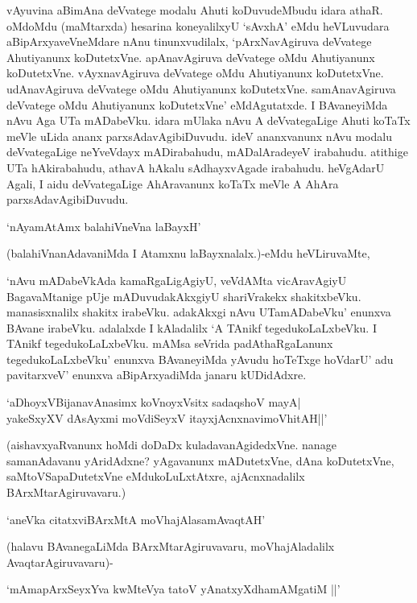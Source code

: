 vAyuvina aBimAna deVvatege modalu Ahuti koDuvudeMbudu idara athaR. oMdoMdu (maMtarxda) hesarina koneyalilxyU `sAvxhA' eMdu heVLuvudara aBipArxyaveVneMdare nAnu tinunxvudilalx, `pArxNavAgiruva deVvatege Ahutiyanunx koDutetxVne. apAnavAgiruva deVvatege oMdu Ahutiyanunx koDutetxVne. vAyxnavAgiruva deVvatege oMdu Ahutiyanunx koDutetxVne. udAnavAgiruva deVvatege oMdu Ahutiyanunx koDutetxVne. samAnavAgiruva deVvatege oMdu Ahutiyanunx koDutetxVne' eMdAgutatxde. I BAvaneyiMda nAvu Aga UTa mADabeVku. idara mUlaka nAvu A deVvategaLige Ahuti koTaTx meVle uLida ananx parxsAdavAgibiDuvudu. ideV ananxvanunx nAvu modalu deVvategaLige neYveVdayx mADirabahudu, mADalAradeyeV irabahudu. atithige UTa hAkirabahudu, athavA hAkalu sAdhayxvAgade irabahudu. heVgAdarU Agali, I aidu deVvategaLige AhAravanunx koTaTx meVle A AhAra parxsAdavAgibiDuvudu.

\begin{shloka}
`nAyamAtAmx balahiVneVna laBayxH'
\end{shloka}

(balahiVnanAdavaniMda I Atamxnu laBayxnalalx.)-eMdu heVLiruvaMte,

`nAvu mADabeVkAda kamaRgaLigAgiyU, veVdAMta vicAravAgiyU BagavaMtanige pUje mADuvudakAkxgiyU shariVrakekx shakitxbeVku. manasisxnalilx shakitx irabeVku. adakAkxgi nAvu UTamADabeVku' enunxva BAvane irabeVku. adalalxde I kAladalilx `A TAnikf tegedukoLaLxbeVku. I TAnikf tegedukoLaLxbeVku. mAMsa seVrida padAthaRgaLanunx tegedukoLaLxbeVku' enunxva BAvaneyiMda yAvudu hoTeTxge hoVdarU' adu pavitarxveV' enunxva aBipArxyadiMda janaru kUDidAdxre.

\begin{shloka}
`aDhoyxV\s BijanavAnasimx koV\s noyxV\s sitx sadaqshoV mayA|\\
yakeSxyXV dAsAyxmi moVdiSeyxV itayxjAcnxnavimoVhitAH||'
\end{shloka}

(aishavxyaRvanunx hoMdi doDaDx kuladavanAgidedxVne. nanage samanAdavanu yAridAdxne? yAgavanunx mADutetxVne, dAna koDutetxVne, saMtoVSapaDutetxVne eMdukoLuLxtAtxre, ajAcnxnadalilx BArxMtarAgiruvavaru.)

\begin{shloka}
`aneVka citatxviBArxMtA moVhajAlasamAvaqtAH'
\end{shloka}

(halavu BAvanegaLiMda BArxMtarAgiruvavaru, moVhajAladalilx Avaqta\-rAgiruvavaru)-

\begin{shloka}
`mAmapArxSeyxYva kwMteVya tatoV yAnatxyXdhamAMgatiM ||'
\end{shloka}

